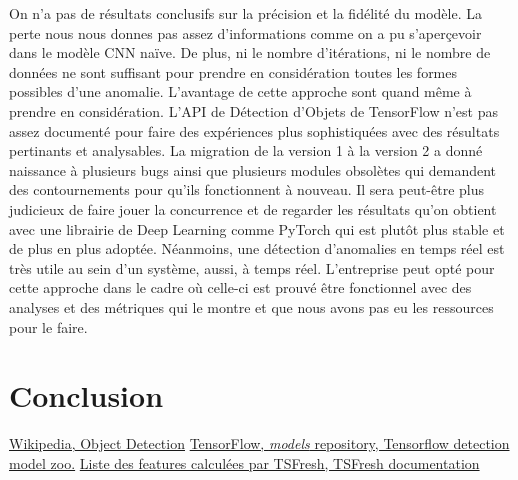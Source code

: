 \documentclass[french]{article}
\theoremstyle{mytheoremstyle}
\theoremstyle{mytheoremstyle}
\theoremstyle{myproblemstyle}
\begin{document}
    \indent On n'a pas de résultats conclusifs sur la précision et la fidélité du modèle. La perte nous nous donnes pas assez d'informations comme on a pu s'aperçevoir dans le modèle CNN naïve. De plus, ni le nombre d'itérations, ni le nombre de données ne sont suffisant pour prendre en considération toutes les formes possibles d'une anomalie. L'avantage de cette approche sont quand même à prendre en considération. L'API de Détection d'Objets de TensorFlow n'est pas assez documenté pour faire des expériences plus sophistiquées avec des résultats pertinants et analysables. La migration de la version 1 à la version 2 a donné naissance à plusieurs bugs ainsi que plusieurs modules obsolètes qui demandent des contournements pour qu'ils fonctionnent à nouveau. Il sera peut-être plus judicieux de faire jouer la concurrence et de regarder les résultats qu'on obtient avec une librairie de Deep Learning comme PyTorch qui est plutôt plus stable et de plus en plus adoptée.
    \newline
    \indent Néanmoins, une détection d'anomalies en temps réel est très utile au sein d'un système, aussi, à temps réel. L'entreprise peut opté pour cette approche dans le cadre où celle-ci est prouvé être fonctionnel avec des analyses et des métriques qui le montre et que nous avons pas eu les ressources pour le faire.
    \section{Conclusion}

\renewcommand\refname{7\indent Références}
\begin{thebibliography}{1}
 \href{https://en.wikipedia.org/wiki/Object\_detection}{Wikipedia, Object Detection}
 \href{https://github.com/tensorflow/models/blob/master/research/object_detection/g3doc/detection_model_zoo.md#coco-trained-models}{TensorFlow, \textit{models} repository, Tensorflow detection model zoo.}
 \href{https://tsfresh.readthedocs.io/en/latest/text/list_of_features.html}{Liste des features calculées par TSFresh, TSFresh documentation}
\end{thebibliography}
\end{document}
